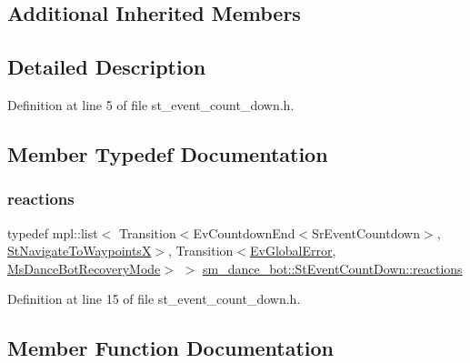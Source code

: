 \subsection*{Additional Inherited Members}


\subsection{Detailed Description}


Definition at line 5 of file st\+\_\+event\+\_\+count\+\_\+down.\+h.



\subsection{Member Typedef Documentation}
\mbox{\label{structsm__dance__bot_1_1StEventCountDown_a19070a7928050e2ecfc234de07903c59}} 
\subsubsection{\texorpdfstring{reactions}{reactions}}
{\footnotesize\ttfamily typedef mpl\+::list$<$ Transition$<$Ev\+Countdown\+End$<$Sr\+Event\+Countdown$>$, \hyperlink{structsm__dance__bot_1_1StNavigateToWaypointsX}{St\+Navigate\+To\+WaypointsX}$>$, Transition$<$\hyperlink{structsm__dance__bot_1_1EvGlobalError}{Ev\+Global\+Error}, \hyperlink{classsm__dance__bot_1_1MsDanceBotRecoveryMode}{Ms\+Dance\+Bot\+Recovery\+Mode}$>$ $>$ \hyperlink{structsm__dance__bot_1_1StEventCountDown_a19070a7928050e2ecfc234de07903c59}{sm\+\_\+dance\+\_\+bot\+::\+St\+Event\+Count\+Down\+::reactions}}



Definition at line 15 of file st\+\_\+event\+\_\+count\+\_\+down.\+h.



\subsection{Member Function Documentation}
\mbox{\label{structsm__dance__bot_1_1StEventCountDown_a6095670c25c304d3839ee3a1a24ec193}} 

